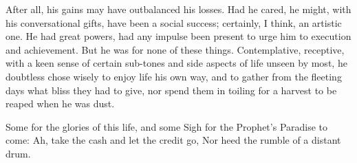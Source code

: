 After all, his gains may have outbalanced his losses. Had he cared, he
might, with his conversational gifts, have been a social success;
certainly, I think, an artistic one. He had great powers, had any
impulse been present to urge him to execution and achievement. But he
was for none of these things. Contemplative, receptive, with a keen
sense of certain sub-tones and side aspects of life unseen by most, he
doubtless chose wisely to enjoy life his own way, and to gather from
the fleeting days what bliss they had to give, nor spend them in
toiling for a harvest to be reaped when he was dust.

\startnarrower
\startlines
Some for the glories of this life, and some
Sigh for the Prophet's Paradise to come:
Ah, take the cash and let the credit go,
Nor heed the rumble of a distant drum.
\stoplines
\stopnarrower
